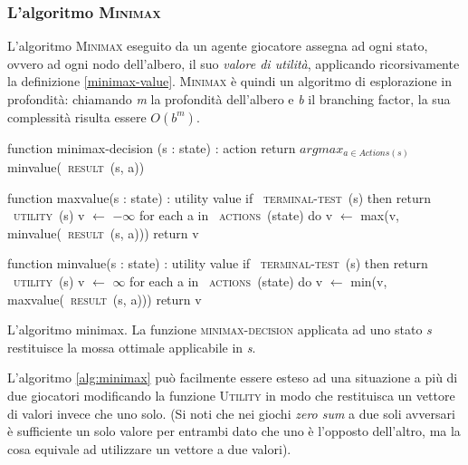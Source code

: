 %
%
%
%

\subsubsection*{L'algoritmo \textsc{Minimax}}

L'algoritmo \textsc{Minimax} eseguito da un agente giocatore assegna ad ogni stato, ovvero ad ogni nodo dell'albero, il suo \emph{valore di utilità}, applicando ricorsivamente la definizione \ref{minimax-value}.
\textsc{Minimax} è quindi un algoritmo di esplorazione in profondità: chiamando \emph{m} la profondità dell'albero e \emph{b} il branching factor, la sua complessità risulta essere $O(b^m)$.





\begin{algorithm}
\label{alg:minimax}
\begin{PseudoCode}[mathescape,escapechar=~]
function minimax-decision (s : state) : action
   return $argmax_{a \in Actions(s)}$ minvalue(~\textsc{result}~(s, a))

function maxvalue(s : state) : utility value
   if ~\textsc{terminal-test}~(s) then return ~\textsc{utility}~(s)
   v $ \leftarrow $ $ - \infty $
   for each a in ~\textsc{actions}~(state) do
      v $ \leftarrow $ max(v, minvalue(~\textsc{result}~(s, a)))
   return v
   
function minvalue(s : state) : utility value
   if ~\textsc{terminal-test}~(s) then return ~\textsc{utility}~(s)
   v $ \leftarrow $ $ \infty $
   for each a in ~\textsc{actions}~(state) do
      v $ \leftarrow $ min(v, maxvalue(~\textsc{result}~(s, a)))
   return v
\end{PseudoCode}
\caption{L'algoritmo minimax. La funzione \textsc{minimax-decision} applicata ad uno stato \emph{s} restituisce la mossa ottimale applicabile in \emph{s}. \cite{randw}}
\end{algorithm}

L'algoritmo \ref{alg:minimax} può facilmente essere esteso ad una situazione a più di due giocatori modificando la funzione \textsc{Utility} in modo che restituisca un vettore di valori invece che uno solo.
(Si noti che nei giochi \emph{zero sum} a due soli avversari è sufficiente un solo valore per entrambi dato che uno è l'opposto dell'altro, ma la cosa equivale ad utilizzare un vettore a due valori).

